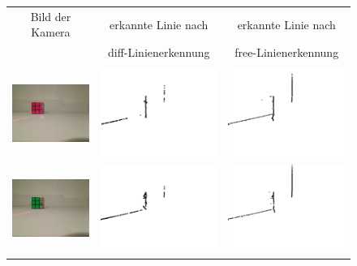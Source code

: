 \documentclass[ngerman,a4paper,parskip=half]{scrartcl}
\begin{document}
\begin{figure}[H]
	\centering
	\begin{tabular}{c|c|c}
		Bild der Kamera & erkannte Linie nach & erkannte Linie nach \\
		& diff-Linienerkennung & free-Linienerkennung \\
		\hline
		& & \\
		
		\includegraphics[width=.32\textwidth]{includes/red_0.png} & 
		\includegraphics[width=.32\textwidth]{includes/red_0_diff.png} &
		\includegraphics[width=.32\textwidth]{includes/red_0_free.png} \\
		
		\includegraphics[width=.32\textwidth]{includes/green_0.png} &
		\includegraphics[width=.32\textwidth]{includes/green_0_diff.png} &
		\includegraphics[width=.32\textwidth]{includes/green_0_free.png} \\
		

\end{tabular}
\end{figure}
\end{document}

